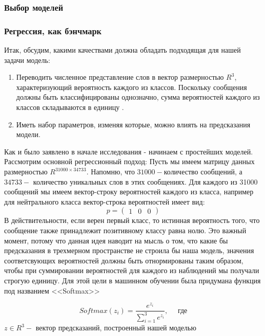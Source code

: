 \documentclass{article}
\begin{document}
 \subsubsection{Выбор моделей}
  \subsubsection*{Регрессия, как бэнчмарк}
Итак, обсудим, какими качествами должна обладать подходящая для нашей задачи модель:
\begin{enumerate}
	\item Переводить численное представление слов в вектор размерностью $R^3$, характеризующий вероятность каждого из классов. Поскольку сообщения должны быть классифицированы однозначно, сумма вероятностей каждого из классов складываются в единицу .
	\item Иметь набор параметров, изменяя которые, можно влиять на предсказания модели.
\end{enumerate}
Как и было заявлено в начале исследования - начинаем с простейших моделей. Рассмотрим основной регрессионный подход:
Пусть мы имеем матрицу данных размерностью $R^{31000 \times 34733}$. Напомню, что $31000 - $количество сообщений, а $34733 - $ количество уникальных слов в этих сообщениях. Для каждого из 31000 сообщений мы имеем вектор-строку вероятностей каждого из класса, например для нейтрального класса вектор-строка вероятностей имеет вид: \[ p = \begin{pmatrix} 1 & 0 & 0\end{pmatrix}\]
В действительности, если верен первый класс, то истинная вероятность того, что сообщение также принадлежит позитивному классу равна нолю. Это важный момент, потому что данная идея наводит на мысль о том, что какие бы предсказания в трехмерном пространстве не строила бы наша модель, значения соответсвующих вероятностей должны быть отнормированы таким образом, чтобы при суммировании вероятностей для каждого из наблюдений мы получали строгую единицу. Для этой цели в машинном обучении была придумана функция под названием <<Softmax>>

\begin{equation*}
Softmax(z_i) = \frac{e^{z_i}}{\sum\limits_{i=1}^{3}e^{z_i}}, \quad \text{ где}
\end{equation*}
$z \in R^3 - $ вектор предсказаний, построенный нашей моделью \\
\end{document}
